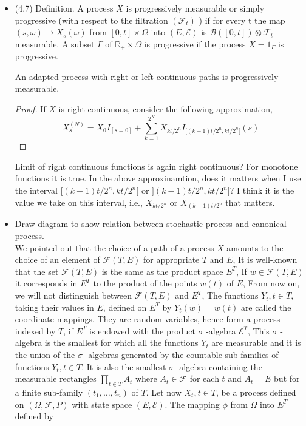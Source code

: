 \begin{itemize}
 \item (4.7) Definition. A process $X$ is progressively measurable or simply progressive (with respect to the filtration $\left(\mathscr{F}_{t}\right)$ ) if for every t the map $(s, \omega) \rightarrow X_{s}(\omega)$ from $[0, t] \times \Omega$ into $(E, \mathscr{E})$ is $\mathscr{B}([0, t]) \otimes \mathscr{F}_{t}$ -measurable. A subset $\Gamma$ of $\mathbb{R}_{+} \times \Omega$ is progressive if the process $X=1_{\Gamma}$ is progressive.
 \begin{proposition}
An adapted process with right or left continuous paths is progressively measurable.
 \end{proposition}
\begin{proof}
	If $ X $ is right continuous, consider the following approximation,
\[ 	X_{s}^{(N)}=X_{0} I_{[s=0]}+\sum_{k=1}^{2^{N}} X_{k t / 2^{n}} I  _{[(k-1) t / 2^{n}, k t / 2^{n}[}
(s)
\]
\end{proof}
\begin{remark}
	Limit of right continuous functions is again right continuous? For monotone functions it is true. In the above approxinamtion, does it matters when I use the interval $ [(k-1) t / 2^{n}, k t / 2^{n}[ $ or $ ](k-1) t / 2^{n}, k t / 2^{n}] $? I think it is the value we take on this interval, i.e., $ X_{k t / 2^{n}} $ or $ X_{(k-1) t / 2^{n}} $ that matters.
\end{remark}
\item Draw diagram to show relation between stochastic process and canonical process. \\
We pointed out that the choice of a path of a process $X$ amounts to the choice of an element of $\mathscr{F}(T, E)$ for appropriate $T$ and $E$,  It is well-known that the set $\mathscr{F}(T, E)$ is the same as the product space $E^{T}$,  If $w \in \mathscr{F}(T, E)$ it corresponds in $E^{T}$ to the product of the points $w(t)$ of $E$,  From now on, we will not distinguish between $\mathscr{F}(T, E)$ and $E^{T}$,  The functions $Y_{t}, t \in T$, taking their values in $E$, defined on $E^{T}$ by $Y_{t}(w)=w(t)$ are called the coordinate mappings. They are random variables, hence form a process indexed by $T$, if $E^{T}$ is endowed with the product $\sigma$ -algebra $\mathscr{E}^{T}$,  This $\sigma$ -algebra is the smallest for which all the functions $Y_{t}$ are measurable and it is the union of the $\sigma$ -algebras generated by the countable sub-families of functions $Y_{t}, t \in T$.  It is also the smallest $\sigma$ -algebra containing the measurable rectangles $\prod_{t \in T} A_{t}$ where $A_{t} \in \mathscr{F}$ for each $t$ and $A_{t}=E$ but for a finite sub-family $\left(t_{1}, \ldots, t_{n}\right)$ of $T$.  Let now $X_{t}, t \in T$, be a process defined on $(\Omega, \mathscr{F}, P)$ with state space $(E, \mathscr{E})$.  The mapping $\phi$ from $\Omega$ into $E^{T}$ defined by

\end{itemize}
